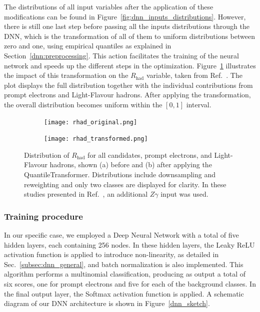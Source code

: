 The distributions of all input variables after the application of these modifications can be found in Figure~\ref{fig:dnn_inputs_distributions}. However, there is still one last step before passing all the inputs distributions through the DNN, which is the transformation of all of them to uniform distributions between zero and one, using empirical quantiles as explained in Section~\ref{dnn:preprocessing}. This action facilitates the training of the neural network and speeds up the different steps in the optimization.
Figure~\ref{fig:transformed} illustrates the impact of this transformation on the $R_{\text{had}}$ variable, taken from Ref.~\cite{dnn_paper}. The plot displays the full distribution together with the individual contributions from prompt electrons and Light-Flavour hadrons. After applying the transformation, the overall distribution becomes uniform within the $[0,1]$ interval.

\begin{figure}[htbp]
  \centering
  \begin{subfigure}[b]{0.45\textwidth}
      \texttt{[image: rhad\_original.png]}
      \caption{}
  \end{subfigure}
  \hfill
  \begin{subfigure}[b]{0.45\textwidth}
      \texttt{[image: rhad\_transformed.png]}
      \caption{}
  \end{subfigure}
  \hfill
  \caption{Distribution of $R_{\text{had}}$ for all candidates, prompt electrons, and Light-Flavour hadrons, shown (a) before and (b) after applying the QuantileTransformer. Distributions include downsampling and reweighting and only two classes are displayed for clarity. In these studies presented in Ref.~\cite{dnn_paper}, an additional $Z\gamma$ input was used.}
  \label{fig:transformed}
\end{figure}

\subsubsection{Training procedure}

In our specific case, we employed a Deep Neural Network with a total of five hidden layers, each containing 256 nodes. In these hidden layers, the Leaky ReLU activation function is applied to introduce non-linearity, as detailed in Sec.~\ref{subsec:dnn_general}, and batch normalization is also implemented.  
This algorithm performs a multinomial classification, producing as output a total of six scores, one for prompt electrons and five for each of the background classes. In the final output layer, the Softmax activation function is applied.  
A schematic diagram of our DNN architecture is shown in Figure~\ref{dnn_sketch}.

